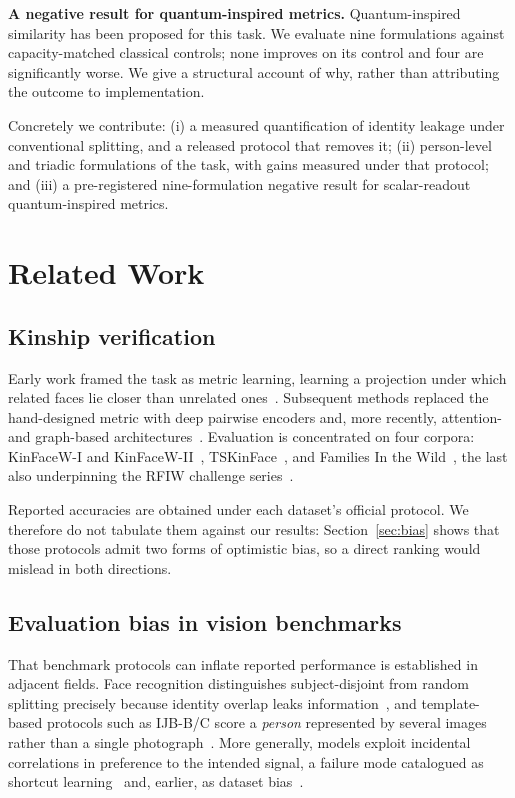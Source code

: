 \documentclass[journal,12pt]{IEEEtran}
\begin{document}
\textbf{A negative result for quantum-inspired metrics.} Quantum-inspired
similarity has been proposed for this task. We evaluate nine formulations
against capacity-matched classical controls; none improves on its control and
four are significantly worse. We give a structural account of why, rather than
attributing the outcome to implementation.

Concretely we contribute: (i) a measured quantification of identity leakage
under conventional splitting, and a released protocol that removes it;
(ii) person-level and triadic formulations of the task, with gains measured
under that protocol; and (iii) a pre-registered nine-formulation negative
result for scalar-readout quantum-inspired metrics.

\section{Related Work}

\subsection{Kinship verification}

Early work framed the task as metric learning, learning a projection under
which related faces lie closer than unrelated ones~\cite{lu2014neighborhood}.
Subsequent methods replaced the hand-designed metric with deep pairwise
encoders and, more recently, attention- and graph-based
architectures~\cite{zhu2022kinship}. Evaluation is concentrated on four
corpora: KinFaceW-I and KinFaceW-II~\cite{lu2012kinfacew},
TSKinFace~\cite{qin2015tri}, and Families In the Wild~\cite{robinson2018fiw},
the last also underpinning the RFIW challenge series~\cite{robinson2020rfiw}.

Reported accuracies are obtained under each dataset's official protocol. We
therefore do not tabulate them against our results: Section~\ref{sec:bias}
shows that those protocols admit two forms of optimistic bias, so a direct
ranking would mislead in both directions.

\subsection{Evaluation bias in vision benchmarks}

That benchmark protocols can inflate reported performance is established in
adjacent fields. Face recognition distinguishes subject-disjoint from random
splitting precisely because identity overlap leaks
information~\cite{kemelmacher2016megaface}, and template-based protocols such as
IJB-B/C score a \emph{person} represented by several images rather than a
single photograph~\cite{whitelam2017ijbb}. More generally, models exploit
incidental correlations in preference to the intended signal, a failure mode
catalogued as shortcut learning~\cite{geirhos2020shortcut} and, earlier, as
dataset bias~\cite{torralba2011unbiased}.
\end{document}
